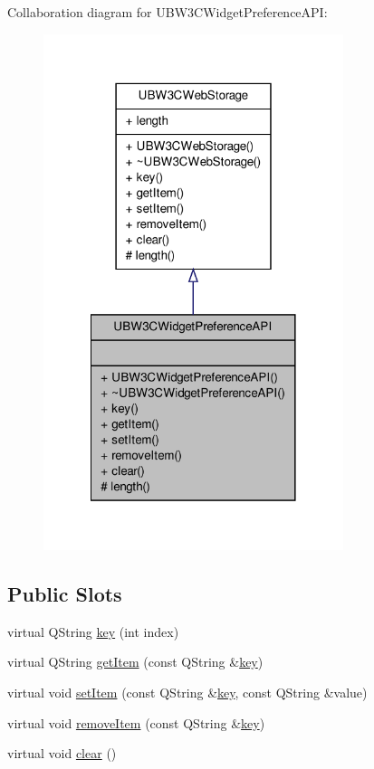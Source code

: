 Collaboration diagram for U\-B\-W3\-C\-Widget\-Preference\-A\-P\-I\-:
\nopagebreak
\begin{figure}[H]
\begin{center}
\leavevmode
\includegraphics[width=248pt]{d0/d9e/class_u_b_w3_c_widget_preference_a_p_i__coll__graph}
\end{center}
\end{figure}
\subsection*{Public Slots}
\begin{DoxyCompactItemize}
\item 
virtual Q\-String \hyperlink{class_u_b_w3_c_widget_preference_a_p_i_aea6c6ea8bfae6c1024a996aed7a298fe}{key} (int index)
\item 
virtual Q\-String \hyperlink{class_u_b_w3_c_widget_preference_a_p_i_a89db17afc9fce91b449b1bf1a663f66c}{get\-Item} (const Q\-String \&\hyperlink{class_u_b_w3_c_widget_preference_a_p_i_aea6c6ea8bfae6c1024a996aed7a298fe}{key})
\item 
virtual void \hyperlink{class_u_b_w3_c_widget_preference_a_p_i_a3f3d1495163d732c5cf22aa3425a9cf2}{set\-Item} (const Q\-String \&\hyperlink{class_u_b_w3_c_widget_preference_a_p_i_aea6c6ea8bfae6c1024a996aed7a298fe}{key}, const Q\-String \&value)
\item 
virtual void \hyperlink{class_u_b_w3_c_widget_preference_a_p_i_a9e85a7a02209b15ebe7d18eff2d2939a}{remove\-Item} (const Q\-String \&\hyperlink{class_u_b_w3_c_widget_preference_a_p_i_aea6c6ea8bfae6c1024a996aed7a298fe}{key})
\item 
virtual void \hyperlink{class_u_b_w3_c_widget_preference_a_p_i_a0fe5565d555648673a55d2e6980a5c36}{clear} ()
\end{DoxyCompactItemize}
